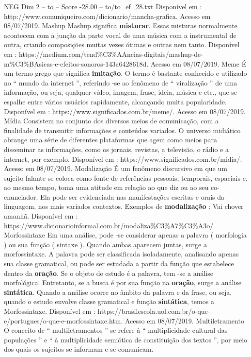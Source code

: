 \begin{textsample}{NEG Dim 2 – to – Score -28.00 – to/to\_ef\_28.txt}
Disponível em : http://www.comuniqueiro.com/dicionario/mancha-grafica.
Acesso em 08/07/2019.
Mashup Mashup significa \textbf{misturar}.
Essas misturas normalmente acontecem com a junção da parte vocal de uma música com a instrumental de outra, criando composições muitas vezes ótimas e outras nem tanto.
Disponível em : https://medium.com/tend\%C3\%AAncias-digitais/mashup-de-m\%C3\%BAsicas-e-efeitos-sonoros-143a6428618d.
Acesso em 08/07/2019.
Meme É um termo grego que significa \textbf{imitação}.
O termo é bastante conhecido e utilizado no “ mundo da internet ”, referindo -se ao fenômeno de “ viralização ” de uma informação, ou seja, qualquer vídeo, imagem, frase, ideia, música e etc., que se espalhe entre vários usuários rapidamente, alcançando muita popularidade.
Disponível em : https://www.significados.com.br/meme/.
Acesso em 08/07/2019.
Mídia Consistem no conjunto dos diversos meios de comunicação, com a finalidade de transmitir informações e conteúdos variados.
O universo midiático abrange uma série de diferentes plataformas que agem como meios para disseminar as informações, como os jornais, revistas, a televisão, o rádio e a internet, por exemplo.
Disponível em : https://www.significados.com.br/midia/.
Acesso em 08/07/2019.
Modalização É um fenômeno discursivo em que um sujeito falante se coloca como fonte de referências pessoais, temporais, espaciais e, ao mesmo tempo, toma uma atitude em relação ao que diz ou ao seu co-enunciador.
Ela pode ser evidenciada nas manifestações escritas e orais da linguagem, nos mais variados contextos.
Exemplos de \textbf{modalização} : Vai chover amanhã.
Disponível em : https://www.dicionarioinformal.com.br/modaliza\%C3\%A7\%C3\%A3o/ Morfossintaxe Em uma análise, pode -se considerar apenas a palavra ( morfologia ) ou sua função ( sintaxe ).
Quando ambas aparecem juntas, surge a morfossintaxe.
A palavra pode ser classificada isoladamente, analisando apenas sua classe gramatical, ou pode ser estudada a partir da função que estabelece dentro da \textbf{oração}.
Se o objeto de estudo é a palavra, tem -se a análise morfológica.
Entretanto, se a busca é por sua função na \textbf{oração}, surge a análise \textbf{sintática}.
Quando a análise ocorre no âmbito da palavra e da frase, ou seja, quando o estudo envolve classe gramatical e função \textbf{sintática}, temos a Morfossintaxe.
Disponível em : https://brasilescola.uol.com.br/o-que-e/portugues/o-que-e-morfossintaxe.htm.
Acesso em 08/07/2019.
Multiletramento O conceito de “ multiletramentos ” se refere à “ multiplicidade cultural das populações ” e “ à multiplicidade semiótica de constituição dos textos ”, por meio dos quais os sujeitos se informam e se comunicam.

\end{textsample}
